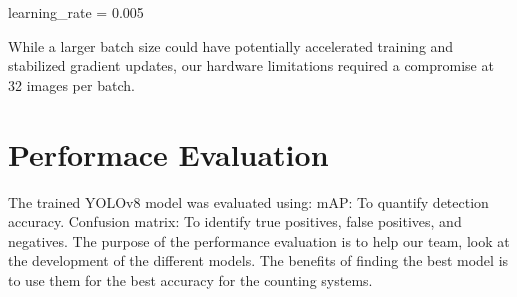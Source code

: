 learning\_rate = 0.005

While a larger batch size could have potentially accelerated training and stabilized gradient updates, our hardware limitations required a compromise at 32 images per batch.

\section{Performace Evaluation}

The trained YOLOv8 model was evaluated using:
mAP: To quantify detection accuracy.
Confusion matrix: To identify true positives, false positives, and negatives.
The purpose of the performance evaluation is to help our team, look at the development of the different models. The benefits of finding the best model is to use them for the best accuracy for the counting systems.